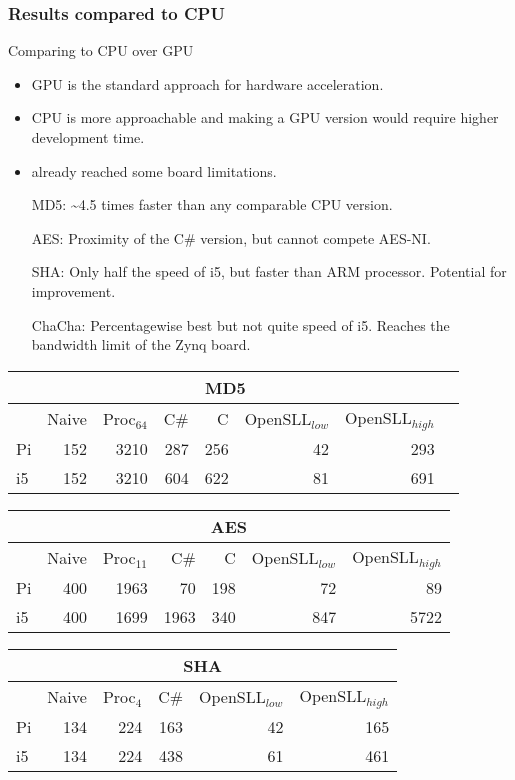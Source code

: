 \begin{frame}
  \frametitle{Results compared to CPU}
  \fontsize{4pt}{6}\selectfont
\begin{minipage}[b]{0.4\textwidth}
  \begin{tiny}
  Comparing to CPU over GPU
  \begin{itemize}
    \item GPU is the standard approach for hardware acceleration.
    \item CPU is more approachable and making a GPU version would require higher development time.
    \item already reached some board limitations.
  \end{itemize}
  \begin{itemize}
    \item[MD5:] \textasciitilde 4.5 times faster than any comparable CPU version.
    \item[AES:] Proximity of the C\# version, but cannot compete AES-NI.
    \item[SHA:] Only half the speed of i5, but faster than ARM processor. Potential for improvement.
    \item[ChaCha:] Percentagewise best but not quite speed of i5. Reaches the bandwidth limit of the Zynq board.
  \end{itemize}
  \end{tiny}
\end{minipage}
\qquad
\begin{minipage}[b]{0.55\textwidth}
\begin{tabular}{l r r r r r r r}
\multicolumn{7}{c}{MD5}\\
\hline
 & Naive & Proc$_{64}$ & C\# & C & OpenSLL$_{low}$ & OpenSLL$_{high}$\\
\hline
Pi & 152 & 3210 & 287 & 256 & 42 & 293\\
i5 & 152 & 3210 & 604 & 622 & 81 & 691
\end{tabular}

\begin{tabular}{l r r r r r r}
\multicolumn{7}{c}{AES}\\
\hline
 & Naive & Proc$_{11}$ & C\# & C & OpenSLL$_{low}$ & OpenSLL$_{high}$\\
\hline
Pi & 400 & 1963 &    70& 198 & 72  & 89\\
  i5 & 400 & 1699 & 1963& 340 & 847 & 5722
\end{tabular}
\begin{tabular}{l r r r r r}
\multicolumn{6}{c}{SHA}\\
\hline
 & Naive & Proc$_{4}$ & C\# & OpenSLL$_{low}$ & OpenSLL$_{high}$\\
\hline
Pi & 134 & 224 & 163 & 42 & 165\\
i5 & 134 & 224 & 438 & 61 & 461
\end{tabular}


\end{minipage}
\end{frame}

